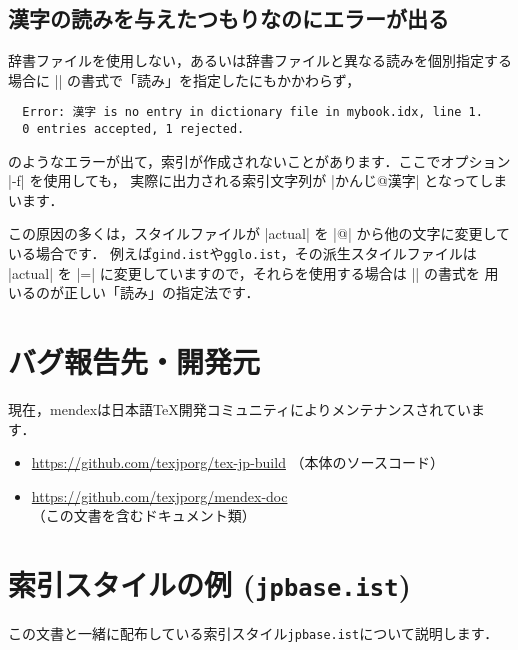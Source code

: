 \documentclass[a4paper,dvipdfmx]{jsarticle}
\newcommand{\SoftName}[1]{\textsf{#1}}
\newcommand{\FileName}[1]{\texttt{#1}}
\begin{document}
\subsection{漢字の読みを与えたつもりなのにエラーが出る}
辞書ファイルを使用しない，あるいは辞書ファイルと異なる読みを個別指定する場合に
|| の書式で「読み」を指定したにもかかわらず，
\begin{verbatim}
  Error: 漢字 is no entry in dictionary file in mybook.idx, line 1.
  0 entries accepted, 1 rejected.
\end{verbatim}
のようなエラーが出て，索引が作成されないことがあります．ここでオプション |-f| を使用しても，
実際に出力される索引文字列が |かんじ@漢字| となってしまいます．

この原因の多くは，スタイルファイルが |actual| を |@| から他の文字に変更している場合です．
例えば\FileName{gind.ist}や\FileName{gglo.ist}，その派生スタイルファイルは
|actual| を |=| に変更していますので，それらを使用する場合は || の書式を
用いるのが正しい「読み」の指定法です．

\section{バグ報告先・開発元}
現在，\SoftName{mendex}は日本語\TeX 開発コミュニティによりメンテナンスされています．
\begin{itemize}
  \item \url{https://github.com/texjporg/tex-jp-build} （本体のソースコード）
  \item \url{https://github.com/texjporg/mendex-doc} （この文書を含むドキュメント類）
\end{itemize}

\clearpage
\appendix

\section{索引スタイルの例 (\FileName{jpbase.ist})}
この文書と一緒に配布している索引スタイル\FileName{jpbase.ist}について説明します．
\end{document}
